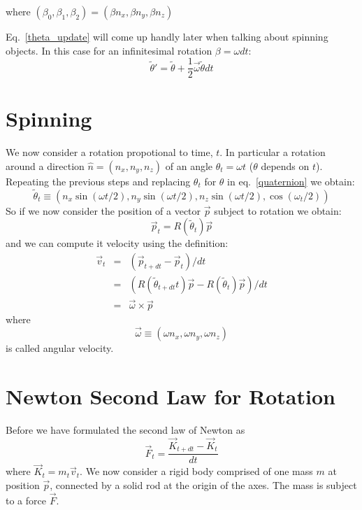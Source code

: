 \documentclass[12pt]{article}
\begin{document}
where $(\beta_0,\beta_1,\beta_2)=(\beta n_x,\beta n_y,\beta n_z)$

Eq.~\ref{theta_update} will come up handly later when talking about spinning objects. In this case for an infinitesimal rotation $\beta=\omega dt$:
\begin{equation}
\tilde \theta' = \tilde \theta + \frac{1}{2}\vec \omega \tilde \theta dt
\end{equation}

\section{Spinning}

We now consider a rotation propotional to time, $t$. In particular a rotation around a direction $\hat n=(n_x,n_y,n_z)$ of an angle $\theta_t = \omega t$ ($\theta$ depends on $t$). Repeating the previous steps and replacing $\theta_t$ for $\theta$ in eq.~\ref{quaternion} we obtain:
\begin{equation}
\tilde \theta_t \equiv (n_x \sin(\omega t/2), n_y \sin(\omega t/2), n_z \sin(\omega t/2),\cos(\omega_t/2))
\end{equation}
So if we now consider the position of a vector $\vec p$ subject to rotation we obtain:
\begin{equation}
\vec p_t = R(\tilde \theta_t) \vec p
\end{equation}
and we can compute it velocity using the definition:
\begin{eqnarray}
\vec v_t &=& (\vec p_{t+dt} - \vec p_t)/dt \\
         &=& (R(\tilde \theta_{t+dt}t) \vec p - R(\tilde \theta_t) \vec p)/dt \\
         &=& \vec \omega \times \vec p
\label{vomega}
\end{eqnarray}
where
\begin{equation}
\vec \omega \equiv (\omega n_x, \omega n_y, \omega n_z)
\end{equation}
is called angular velocity.

\section{Newton Second Law for Rotation}

Before we have formulated the second law of Newton as
\begin{equation}
\vec F_t = \frac{\vec K_{t+dt}-\vec K_t}{dt}
\end{equation}
where $\vec K_t = m_t \vec v_t$.
We now consider a rigid body comprised of one mass $m$ at position $\vec p$, connected by a solid rod at the origin of the axes. The mass is subject to a force $\vec F$.
\end{document}
